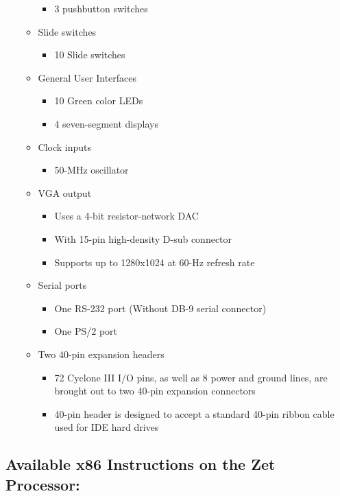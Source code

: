 \documentclass[pdftex,10.5pt]{report}
\begin{document}
\begin{itemize}
\begin{itemize}
		\begin{itemize}
		\item 3 pushbutton switches
		\end{itemize}
	\item Slide switches
		\begin{itemize}
		\item 10 Slide switches
		\end{itemize}
	\item General User Interfaces
		\begin{itemize}
		\item 10 Green color LEDs
		\item 4 seven-segment displays
		\end{itemize}
	\item Clock inputs
		\begin{itemize}
		\item 50-MHz oscillator
		\end{itemize}
	\item VGA output
		\begin{itemize}
		\item Uses a 4-bit resistor-network DAC
		\item With 15-pin high-density D-sub connector
		\item Supports up to 1280x1024 at 60-Hz refresh rate
		\end{itemize}
	\item Serial ports
		\begin{itemize}
		\item One RS-232 port (Without DB-9 serial connector)
		\item One PS/2 port
		\end{itemize}
	\item Two 40-pin expansion headers
		\begin{itemize}
		\item 72 Cyclone III I/O pins, as well as 8 power and ground lines, are brought out to two 40-pin expansion connectors
		\item40-pin header is designed to accept a standard 40-pin ribbon cable used for IDE hard drives
		\end{itemize}
	\end{itemize}
\end{itemize}

\label{App:AppendixB}
\subsection{Available x86 Instructions on the Zet Processor:}
\end{document}

